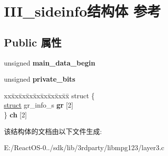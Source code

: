 \hypertarget{struct_i_i_i__sideinfo}{}\section{I\+I\+I\+\_\+sideinfo结构体 参考}
\label{struct_i_i_i__sideinfo}
\subsection*{Public 属性}
\begin{DoxyCompactItemize}
\item 
\mbox{\label{struct_i_i_i__sideinfo_a403156deecf3f95c4638df405ec52461}} 
unsigned {\bfseries main\+\_\+data\+\_\+begin}
\item 
\mbox{\label{struct_i_i_i__sideinfo_addace7df0711eb6afa2e58c42b9de35d}} 
unsigned {\bfseries private\+\_\+bits}
\item 
\mbox{\label{struct_i_i_i__sideinfo_a2ecb0714f1cfc75ca4fb82a6ca4c9241}} 
\begin{tabbing}
xx\=xx\=xx\=xx\=xx\=xx\=xx\=xx\=xx\=\kill
struct \{\\
\>\hyperlink{interfacestruct}{struct} gr\_info\_s {\bfseries gr} \mbox{[}2\mbox{]}\\
\} {\bfseries ch} \mbox{[}2\mbox{]}\\

\end{tabbing}\end{DoxyCompactItemize}


该结构体的文档由以下文件生成\+:\begin{DoxyCompactItemize}
\item 
E\+:/\+React\+O\+S-\/0../sdk/lib/3rdparty/libmpg123/layer3.\+c\end{DoxyCompactItemize}
